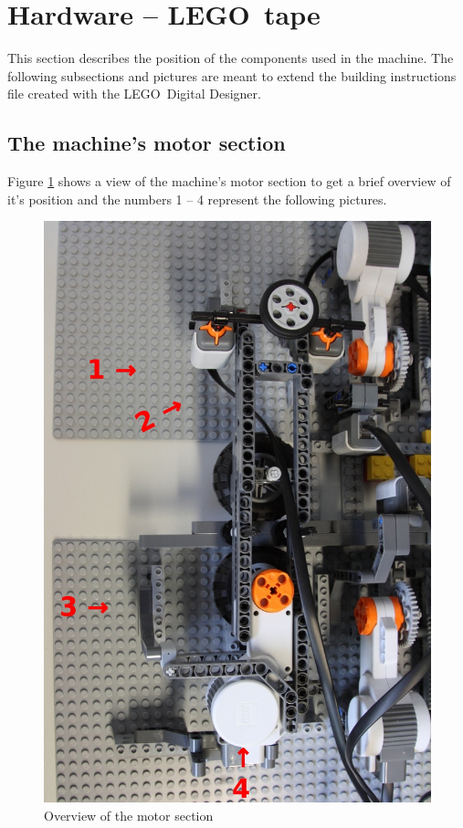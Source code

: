 \documentclass[%
  a4paper,%
  11pt,%
  blue,%
  hyperref	%
  ]{tubsartcl}
\begin{document}
\clearpage

\section{Hardware -- LEGO\textregistered\, tape}
\label{sec:hardw-lego-tape}

This section describes the position of the components used in the machine. The following subsections and pictures are meant to extend the building instructions file created with the LEGO\textregistered\, Digital Designer.

\subsection{The machine's motor section}

Figure \ref{pic:topview} shows a view of the machine's motor section to get a brief overview of it's position and the numbers 1 -- 4 represent the following pictures.

\begin{figure}[!htb]
\begin{center}
\includegraphics[scale=0.28]{graphics_lego/topview.jpg}
\end{center}
\caption{Overview of the motor section}
\label{pic:topview}
\end{figure}
\end{document}
